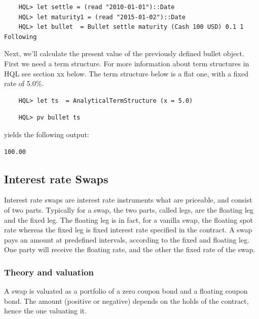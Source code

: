 \documentclass[11pt,a4paper]{article}
\numberwithin{equation}{section}
\begin{document}
	\begin{lstlisting}
	HQL> let settle = (read "2010-01-01")::Date
	HQL> let maturity1 = (read "2015-01-02")::Date
	HQL> let bullet  = Bullet settle maturity (Cash 100 USD) 0.1 1 Following
	\end{lstlisting}
	
	Next, we'll calculate the present value of the previously defined bullet object. First we need a term structure. For more information about term structures in HQL see section xx below. The term structure below is a flat one, with a fixed rate of 5.0\%.
	
	\begin{lstlisting}
	HQL> let ts  = AnalyticalTermStructure (x = 5.0)	
	\end{lstlisting}

	\begin{lstlisting}	
	HQL> pv bullet ts
	\end{lstlisting}
	
	yields the following output:
	\FrameSep
	\begin{lstlisting}[style=Output]
	100.00
	\end{lstlisting}



	\subsection{Interest rate Swaps}
	Interest rate swaps are interest rate instruments what are priceable, and consist of two parts. Typically for a swap, the
	two parts, called legs, are the floating leg and the fixed leg. The floating leg is in fact, for a vanilla swap, the floating spot rate whereas the fixed leg is fixed interest rate specified in the contract. A swap pays an amount at predefined intervals, according to the fixed and floating leg. One party will receive the floating rate, and the other the fixed rate of the swap.

	\subsubsection{Theory and valuation}
	A swap is valuated as a portfolio of a zero coupon bond and a floating coupon bond. The amount (positive or negative) depends on the holds of the contract, hence the one valuating it.
\end{document}
